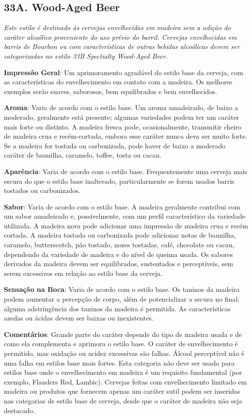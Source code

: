 \subsection*{33A. Wood-Aged Beer}
\textit{Este estilo é destinado às cervejas envelhecidas em madeira sem a adição do caráter alcoólico proveniente do uso prévio do barril. Cervejas envelhecidas em barris de Bourbon ou com características de outras bebidas alcoólicas devem ser categorizadas no estilo 33B Spectialty Wood-Aged Beer.}

\textbf{Impressão Geral}: Um aprimoramento agradável do estilo base da cerveja, com as características do envelhecimento em contato com a madeira. Os melhores exemplos serão suaves, saborosos, bem equilibrados e bem envelhecidos.

\textbf{Aroma}: Varia de acordo com o estilo base. Um aroma amadeirado, de baixo a moderado, geralmente está presente; algumas variedades podem ter um caráter mais forte ou distinto. A madeira fresca pode, ocasionalmente, transmitir cheiro de madeira crua e recém-cortada, embora esse caráter nunca deva ser muito forte. Se a madeira for tostada ou carbonizada, pode haver de baixo a moderado caráter de baunilha, caramelo, toffee, tosta ou cacau.

\textbf{Aparência}: Varia de acordo com o estilo base. Frequentemente uma cerveja mais escura do que o estilo base inalterado, particularmente se forem usados barris tostados ou carbonizados.

\textbf{Sabor}: Varia de acordo com o estilo base. A madeira geralmente contribui com um sabor amadeirado e, possivelmente, com um perfil característico da variedade utilizada. A madeira nova pode adicionar uma impressão de madeira crua e recém cortada. A madeira tostada ou carbonizada pode adicionar notas de baunilha, caramelo, butterscotch, pão tostado, nozes tostadas, café, chocolate ou cacau, dependendo da variedade de madeira e do nível de queima usada. Os sabores derivados da madeira devem ser equilibrados, sustentados e perceptíveis, sem serem excessivos em relação ao estilo base da cerveja.

\textbf{Sensação na Boca}: Varia de acordo com o estilo base. Os taninos da madeira podem aumentar a percepção de corpo, além de potencializar a secura no final; alguma adstringência dos taninos da madeira é permitida. As características azedas ou ácidas devem ser baixas ou inexistentes.

\textbf{Comentários}: Grande parte do caráter depende do tipo de madeira usada e de como ela complementa e aprimora o estilo base. O caráter de envelhecimento é permitido, mas oxidação ou acidez excessivas são falhas. Álcool perceptível não é uma falha em estilos base mais fortes. Esta categoria não deve ser usada para estilos base onde o envelhecimento em madeira é um requisito fundamental (por exemplo, Flanders Red, Lambic). Cervejas feitas com envelhecimento limitado em madeira ou produtos que fornecem apenas um caráter sutil podem ser inseridas nas categorias de estilo base de cerveja, desde que o caráter de madeira não seja destacado.

